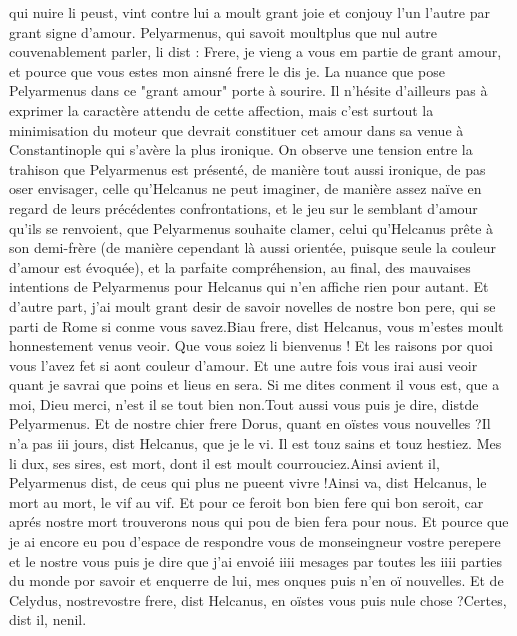 \documentclass{article}
\begin{document}
\begin{pages}
   qui nuire li peust, vint contre lui a moult grant joie et conjouy l’un l’autre par grant signe d’amour. 
   Pelyarmenus, qui savoit 
   moultplus que nul autre couvenablement parler, li dist :
   Frere, je vieng a vous em partie de grant amour, et pource que vous estes mon ainsné frere le dis je.
      La nuance que pose Pelyarmenus dans ce "grant amour" porte à sourire. 
      Il n'hésite d'ailleurs pas à exprimer la caractère attendu de cette affection, mais c'est surtout la minimisation du
     moteur que devrait constituer cet amour dans sa venue à Constantinople qui s'avère la plus ironique. On observe une tension 
      entre la trahison que Pelyarmenus est présenté, de manière tout aussi ironique, de pas oser envisager, celle qu'Helcanus ne peut 
      imaginer, de manière assez naïve en regard de leurs précédentes confrontations, et le jeu sur le semblant d'amour qu'ils se renvoient,
      que Pelyarmenus souhaite clamer, celui qu'Helcanus prête à son demi-frère (de manière cependant là aussi orientée, puisque seule la 
      couleur d'amour est évoquée), et la parfaite compréhension, au final, des mauvaises intentions de Pelyarmenus pour Helcanus 
      qui n'en affiche rien pour autant.
   Et d’autre part, j’ai moult grant desir de savoir novelles de nostre bon pere, 
   qui se parti de Rome si conme vous savez.Biau frere, dist Helcanus, vous m’estes moult honnestement venus 
      veoir. Que vous soiez li bienvenus ! Et les raisons por quoi vous l’avez fet si 
      aont couleur d’amour. Et une autre fois vous irai ausi veoir 
      quant je savrai que poins et lieus 
      en sera. Si me dites conment il vous est, que a moi, Dieu merci, 
      n’est il se tout bien non.Tout aussi vous puis je dire, distde 
      Pelyarmenus. 
   Et de nostre chier frere Dorus, quant en oïstes vous nouvelles ?Il n’a pas iii jours, 
      dist Helcanus, que je le vi. 
      Il est touz sains et touz hestiez. Mes 
      li dux, ses sires, est mort, dont il est moult courrouciez.Ainsi avient il, 
      Pelyarmenus dist, 
      de ceus qui plus ne pueent vivre !Ainsi va, dist Helcanus, 
      le mort au mort, le vif au vif. 
   Et pour ce feroit bon bien fere qui bon seroit, car aprés nostre mort trouverons nous qui pou de bien fera pour nous. 
   Et pource que je ai encore eu pou d’espace de respondre vous de monseingneur vostre 
      perepere et le nostre
   vous puis je dire que j’ai envoié iiii mesages par toutes les iiii parties du monde por savoir et enquerre de lui, 
      mes onques puis n’en oï nouvelles. Et de Celydus, 
      nostrevostre frere, 
   dist Helcanus, en oïstes vous puis nule chose ?Certes, dist il, nenil.

\end{pages}
\end{document}
